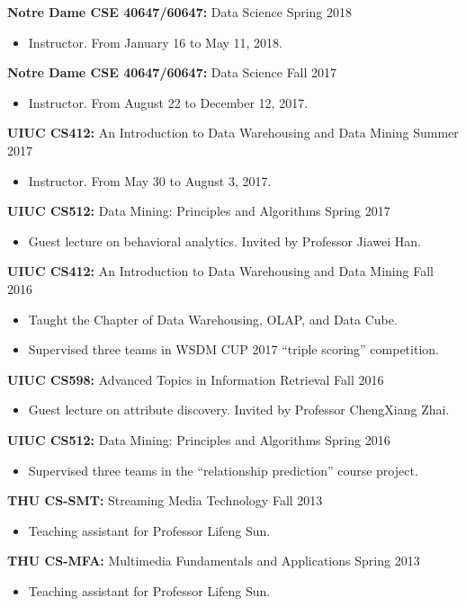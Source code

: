 \documentclass[margin, 9pt]{res}
\begin{document}
\begin{resume}
{\textbf{Notre Dame CSE 40647/60647:} Data Science} \hfill{Spring 2018}
\begin{itemize}
\item Instructor. From January 16 to May 11, 2018.
\end{itemize}
\vspace{-0.1in}
{\textbf{Notre Dame CSE 40647/60647:} Data Science} \hfill{Fall 2017}
\begin{itemize}
\item Instructor. From August 22 to December 12, 2017.
\end{itemize}
\vspace{-0.1in}
{\textbf{UIUC CS412:} An Introduction to Data Warehousing and Data Mining} \hfill{Summer 2017}
\begin{itemize}
\item Instructor. From May 30 to August 3, 2017.
\end{itemize}
\vspace{-0.1in}
{\textbf{UIUC CS512:} Data Mining: Principles and Algorithms} \hfill{Spring 2017}
\begin{itemize}
\item Guest lecture on behavioral analytics. Invited by Professor Jiawei Han.
\end{itemize}
\vspace{-0.1in}
{\textbf{UIUC CS412:} An Introduction to Data Warehousing and Data Mining} \hfill{Fall 2016}
\begin{itemize}
\item Taught the Chapter of Data Warehousing, OLAP, and Data Cube.
\item Supervised three teams in WSDM CUP 2017 ``triple scoring'' competition.
\end{itemize}
\vspace{-0.1in}
{\textbf{UIUC CS598:} Advanced Topics in Information Retrieval} \hfill{Fall 2016}
\begin{itemize}
\item Guest lecture on attribute discovery. Invited by Professor ChengXiang Zhai.
\end{itemize}
\vspace{-0.1in}
{\textbf{UIUC CS512:} Data Mining: Principles and Algorithms} \hfill{Spring 2016}
\begin{itemize}
\item Supervised three teams in the ``relationship prediction'' course project.
\end{itemize}
\vspace{-0.1in}
{\textbf{THU CS-SMT:} Streaming Media Technology} \hfill{Fall 2013}
\begin{itemize}
\item Teaching assistant for Professor Lifeng Sun.
\end{itemize}
\vspace{-0.1in}
{\textbf{THU CS-MFA:} Multimedia Fundamentals and Applications} \hfill{Spring 2013}
\begin{itemize}
\item Teaching assistant for Professor Lifeng Sun.
\end{itemize}


\end{resume}
\end{document}
